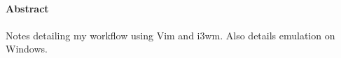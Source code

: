 \documentclass[twoside,10pt]{book}
\numberwithin{equation}{chapter} %
\numberwithin{figure}{chapter}
\begin{document}
	\setcounter{page}{1}
	

	\newpage\null\thispagestyle{empty}\newpage
	\paragraph{ \vspace{3.5cm}}\begin{center}\end{center}



\noindent \textbf{ {\Large Abstract}}

\paragraph{}
Notes detailing my workflow using Vim and i3wm. Also details emulation on
Windows.


\newpage
\paragraph{ \vspace{3.5cm}}\begin{center}\end{center}

\tableofcontents





\cleardoublepage {}

\nocite{*}
{}

\end{document}

